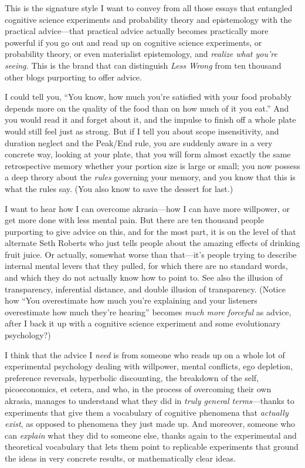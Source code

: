 {
 This is the signature style I want to convey from all those essays
that entangled cognitive science experiments and probability theory and
epistemology with the practical advice---that practical advice actually
becomes practically more powerful if you go out and read up on
cognitive science experiments, or probability theory, or even
materialist epistemology, and \textit{realize what
you're seeing.} This is the brand that can distinguish
\textit{Less Wrong} from ten thousand other blogs purporting to offer
advice.}

{
 I could tell you, ``You know, how much
you're satisfied with your food probably depends more
on the quality of the food than on how much of it you
eat.'' And you would read it and forget about it, and
the impulse to finish off a whole plate would still feel just as
strong. But if I tell you about scope insensitivity, and duration
neglect and the Peak/End rule, you are suddenly aware in a very
concrete way, looking at your plate, that you will form almost exactly
the same retrospective memory whether your portion size is large or
small; you now possess a deep theory about the \textit{rules} governing
your memory, and you know that this is what the rules say. (You also
know to save the dessert for last.)}

{
 I want to hear how I can overcome akrasia---how I can have more
willpower, or get more done with less mental pain. But there are ten
thousand people purporting to give advice on this, and for the most
part, it is on the level of that alternate Seth Roberts who just tells
people about the amazing effects of drinking fruit juice. Or actually,
somewhat worse than that---it's people trying to
describe internal mental levers that they pulled, for which there are
no standard words, and which they do not actually know how to point to.
See also the illusion of transparency, inferential distance, and double
illusion of transparency. (Notice how ``You
overestimate how much you're explaining and your
listeners overestimate how much they're
hearing'' becomes \textit{much more forceful} as
advice, after I back it up with a cognitive science experiment and some
evolutionary psychology?)}

{
 I think that the advice I \textit{need} is from someone who reads
up on a whole lot of experimental psychology dealing with willpower,
mental conflicts, ego depletion, preference reversals, hyperbolic
discounting, the breakdown of the self, picoeconomics, et cetera, and
who, in the process of overcoming their own akrasia, manages to
understand what they did in \textit{truly general terms}{}---thanks to
experiments that give them a vocabulary of cognitive phenomena that
\textit{actually exist}, as opposed to phenomena they just made up. And
moreover, someone who can \textit{explain} what they did to someone
else, thanks again to the experimental and theoretical vocabulary that
lets them point to replicable experiments that ground the ideas in very
concrete results, or mathematically clear ideas.}

